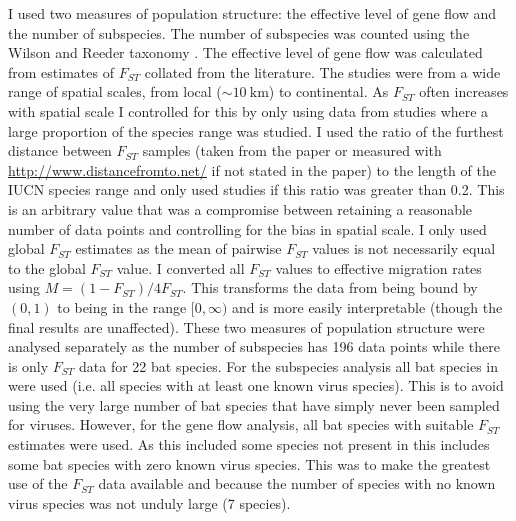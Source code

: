 I used two measures of population structure: the effective level of gene flow and the number of subspecies.
The number of subspecies was counted using the Wilson and Reeder taxonomy \cite{wilson2005mammal}.
The effective level of gene flow was calculated from estimates of $F_{ST}$ collated from the literature.
The studies were from a wide range of spatial scales, from local ($\sim\SI{10}{\kilo\metre}$) to continental.
As $F_{ST}$ often increases with spatial scale \cite{burland1999population, hulva2010mechanisms, o2015genetic, vonhof2015range} I controlled for this by only using data from studies where a large proportion of the species range was studied.
I used the ratio of the furthest distance between $F_{ST}$ samples (taken from the paper or measured with \url{http://www.distancefromto.net/} if not stated in the paper) to the length of the IUCN species range \cite{iucn} and only used studies if this ratio was greater than 0.2.
This is an arbitrary value that was a compromise between retaining a reasonable number of data points and controlling for the bias in spatial scale.
I only used global $F_{ST}$ estimates as the mean of pairwise $F_{ST}$ values is not necessarily equal to the global $F_{ST}$ value.
I converted all $F_{ST}$ values to effective migration rates using $M = (1-F_{ST})/4F_{ST}$.
This transforms the data from being bound by $(0, 1)$ to being in the range $\lbrack 0, \infty)$ and is more easily interpretable (though the final results are unaffected). 
These two measures of population structure were analysed separately as the number of subspecies has 196 data points while there is only $F_{ST}$ data for 22 bat species.
For the subspecies analysis all bat species in \textcite{luis2013comparison} were used (i.e. all species with at least one known virus species).
This is to avoid using the very large number of bat species that have simply never been sampled for viruses.
However, for the gene flow analysis, all bat species with suitable $F_{ST}$ estimates were used.
As this included some species not present in \textcite{luis2013comparison} this includes some bat species with zero known virus species. 
This was to make the greatest use of the $F_{ST}$ data available and because the number of species with no known virus species was not unduly large (7 species).




























